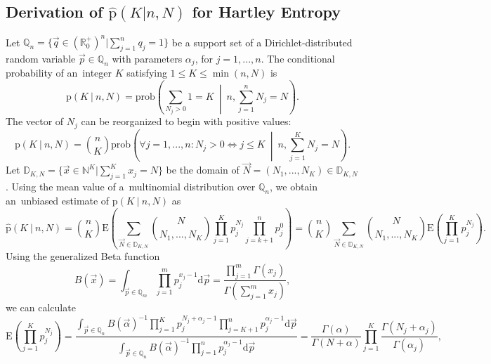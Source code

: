 \subsection {Derivation of $\hat{\mathrm{p}}(K|n,N)$ for Hartley Entropy}
\label{subsec:app1}
Let $\mathbb{Q}_{n} = \{ \vec{q} \in (\mathbb{R}_{0}^{+})^{n} | \sum_{j=1}^{n}q_{j} = 1 \}$ be a support set of a Dirichlet-distributed random variable $\vec{p} \in \mathbb{Q}_{n}$ with parameters $\alpha_j$, for $j = 1,...,n$. The conditional probability of an~integer $K$ satisfying $1 \le K \le \min(n,N)$ is 
\begin{equation} 
\label{eq:probpkn}
\text{p}(K \: | \: n,N) = \text{prob}\left(\sum_{N_{j}>0} 1 = K \: \middle| \: n, \sum_{j=1}^{n}N_{j} = N\right).
\end{equation}
The vector of $N_{j}$ can be reorganized to begin with positive values:
\begin{equation} 
\label{eq:probbinom}
\text{p}(K \: | \: n,N) = {n \choose K}\text{prob}\left( \forall j=1,...,n : N_{j} > 0 \Leftrightarrow j \le K \: \middle| \: n, \sum_{j=1}^{K}N_{j}=N\right).
\end{equation}
Let $\mathbb{D}_{K,N} = \{ \vec{x} \in \mathbb{N}^K | \sum_{j=1}^{K}x_{j} = N \}$ be the domain of $\vec{N} = (N_{1},...,N_{K}) \in \mathbb{D}_{K,N}$. Using the mean value of a~multinomial distribution over $\mathbb{Q}_{n}$, we obtain an~unbiased estimate of $\text{p}(K \: | \: n,N)$ as
\begin{equation} 
\label{eq:probbinomexp}
\mathrm{\hat{p}}(K \: | \: n,N) = {n \choose K} \text{E}\left(\sum_{\vec{N} \in \mathbb{D}_{K,N}} {N \choose N_{1},...,N_{K}} \prod_{j=1}^{K}p_{j}^{N_{j}} \prod_{j=k+1}^{n}p_{j}^{0} \right) = {n \choose K} \sum_{\vec{N} \in \mathbb{D}_{K,N}} {N \choose N_{1},...,N_{K}} \text{E}\left( \prod_{j=1}^{K}p_{j}^{N_{j}}\right).
\end{equation}
Using the generalized Beta function
\begin{equation} 
\label{eq:betafce}
B(\vec{x}) = \int_{\vec{p} \in \mathbb{Q}_{m}} \prod_{j=1}^{m} p_{j}^{x_{j}-1} \text{d}\vec{p} = \frac{\prod_{j=1}^{m} \Gamma(x_{j})}{\Gamma(\sum_{j=1}^{m}x_{j})},
\end{equation}
we can calculate
\begin{equation} 
\label{eq:expprod}
\text{E}\left( \prod_{j=1}^{K}p_{j}^{N_{j}} \right) = \frac{\int_{\vec{p} \in \mathbb{Q}_{n}} {B(\vec{\alpha})}^{-1} \prod_{j=1}^{K} p_{j}^{N_{j}+\alpha_{j}-1}  \prod_{j=K+1}^{n} p_{j}^{\alpha_{j}-1} \text{d}\vec{p}}{\int_{\vec{p} \in \mathbb{Q}_{n}}  {B(\vec{\alpha})}^{-1}\prod_{j=1}^{n} p_{j}^{\alpha_{j}-1} \text{d}\vec{p}} = \frac{\Gamma(\alpha)}{\Gamma(N+\alpha)} \prod_{j=1}^{K} \frac{\Gamma(N_{j}+\alpha_j)}{\Gamma(\alpha_j)},
\end{equation}
